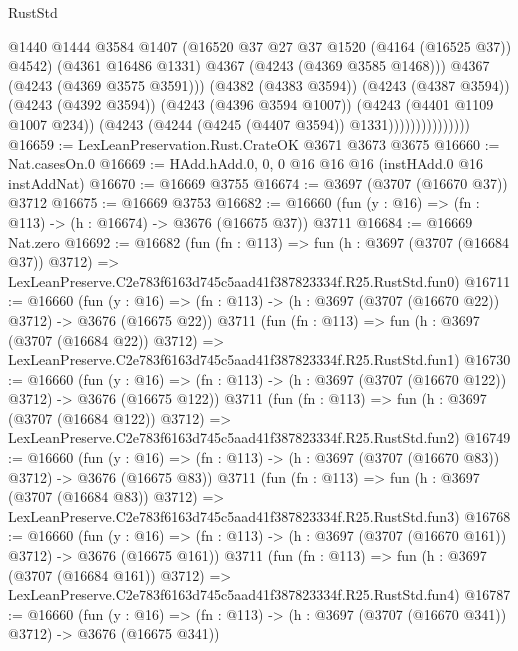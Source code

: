 \begin{lexlean}{RustStd}
\begin{coremodule}
                                  @1440
                                  @1444
                                  @3584
                                  @1407
                                  (@16520 @37 @27 @37 @1520 (@4164 (@16525 @37)) @4542)
                                  (@4361 @16486 @1331)
                                  @4367
                                  (@4243 (@4369 @3585 @1468)))
                                @4367
                                (@4243 (@4369 @3575 @3591)))
                              (@4382 (@4383 @3594))
                              (@4243 (@4387 @3594))
                              (@4243 (@4392 @3594))
                              (@4243 (@4396 @3594 @1007))
                              (@4243 (@4401 @1109 @1007 @234))
                              (@4243 (@4244 (@4245 (@4407 @3594)) @1331)))))))))))))))
@16659 := LexLeanPreservation.Rust.CrateOK @3671 @3673 @3675
@16660 := Nat.casesOn.{0}
@16669 := HAdd.hAdd.{0, 0, 0} @16 @16 @16 (instHAdd.{0} @16 instAddNat)
@16670 := @16669 @3755
@16674 := @3697 (@3707 (@16670 @37)) @3712
@16675 := @16669 @3753
@16682 := @16660 (fun (y : @16) => (fn : @113) -> (h : @16674) -> @3676 (@16675 @37)) @3711
@16684 := @16669 Nat.zero
@16692 := @16682
    (fun (fn : @113) =>
    fun (h : @3697 (@3707 (@16684 @37)) @3712) =>
    LexLeanPreserve.C2e783f6163d745c5aad41f387823334f.R25.RustStd.fun0)
@16711 := @16660
    (fun (y : @16) => (fn : @113) -> (h : @3697 (@3707 (@16670 @22)) @3712) -> @3676 (@16675 @22))
    @3711
    (fun (fn : @113) =>
    fun (h : @3697 (@3707 (@16684 @22)) @3712) =>
    LexLeanPreserve.C2e783f6163d745c5aad41f387823334f.R25.RustStd.fun1)
@16730 := @16660
    (fun (y : @16) => (fn : @113) -> (h : @3697 (@3707 (@16670 @122)) @3712) -> @3676 (@16675 @122))
    @3711
    (fun (fn : @113) =>
    fun (h : @3697 (@3707 (@16684 @122)) @3712) =>
    LexLeanPreserve.C2e783f6163d745c5aad41f387823334f.R25.RustStd.fun2)
@16749 := @16660
    (fun (y : @16) => (fn : @113) -> (h : @3697 (@3707 (@16670 @83)) @3712) -> @3676 (@16675 @83))
    @3711
    (fun (fn : @113) =>
    fun (h : @3697 (@3707 (@16684 @83)) @3712) =>
    LexLeanPreserve.C2e783f6163d745c5aad41f387823334f.R25.RustStd.fun3)
@16768 := @16660
    (fun (y : @16) => (fn : @113) -> (h : @3697 (@3707 (@16670 @161)) @3712) -> @3676 (@16675 @161))
    @3711
    (fun (fn : @113) =>
    fun (h : @3697 (@3707 (@16684 @161)) @3712) =>
    LexLeanPreserve.C2e783f6163d745c5aad41f387823334f.R25.RustStd.fun4)
@16787 := @16660
    (fun (y : @16) => (fn : @113) -> (h : @3697 (@3707 (@16670 @341)) @3712) -> @3676 (@16675 @341))

\end{coremodule}
\end{lexlean}
